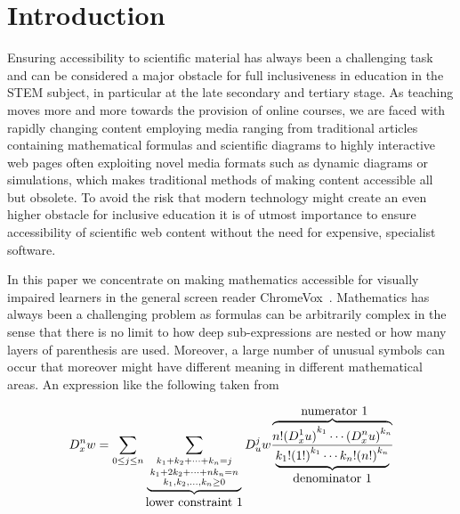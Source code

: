 \documentclass{sig-alternate}
\begin{document}


\section{Introduction}\label{sec:intro} 
Ensuring accessibility to scientific material has always been a challenging task
and can be considered a major obstacle for full inclusiveness in education in
the STEM subject, in particular at the late secondary and tertiary stage. As
teaching moves more and more towards the provision of online courses, we are
faced with rapidly changing content employing media ranging from traditional
articles containing mathematical formulas and scientific diagrams to highly
interactive web pages often exploiting novel media formats such as dynamic
diagrams or simulations, which makes traditional methods of making content
accessible all but obsolete. To avoid the risk that modern technology might
create an even higher obstacle for inclusive education it is of utmost
importance to ensure accessibility of scientific web content without the need
for expensive, specialist software.

In this paper we concentrate on making mathematics accessible for visually
impaired learners in the general screen reader
ChromeVox~\cite{google:chromevox-tutorial}. Mathematics has always been a
challenging problem as formulas can be arbitrarily complex in the sense that
there is no limit to how deep sub-expressions are nested or how many layers of
parenthesis are used. Moreover, a large number of unusual symbols can occur that
moreover might have different meaning in different mathematical areas. An
expression like the following taken from~\cite{knuthart}

 {\small
\begin{equation*}
D^n_xw = \sum_{0\le j\le n} \sum_{\underbrace{{\scriptstyle
        k_1+k_2+\cdots+k_n=j \atop {\scriptstyle
          k_1+2k_2+\cdots+nk_n=n \atop {\scriptstyle
            k_1,k_2,\ldots,k_n\ge0 }}}}_{\mbox{lower constraint
        1}}} D^j_u w
  \frac{\overbrace{n!  {(D^1_x u)}^{k_1} \cdots
      {(D^n_x u)}^{k_n}} ^{\mbox{ numerator 1}}}
  {\underbrace{k_1!{(1!)}^{k_1}
    \cdots k_n!{(n!)}^{k_n}}_{\mbox{denominator 1}}}
\end{equation*}}
\EndAccSupp{}
\end{document}
